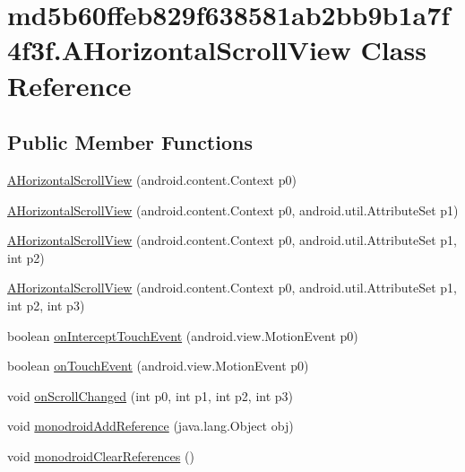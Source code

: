 \hypertarget{classmd5b60ffeb829f638581ab2bb9b1a7f4f3f_1_1_a_horizontal_scroll_view}{
\section{md5b60ffeb829f638581ab2bb9b1a7f4f3f.AHorizontalScrollView Class Reference}
\label{classmd5b60ffeb829f638581ab2bb9b1a7f4f3f_1_1_a_horizontal_scroll_view}
}
\subsection*{Public Member Functions}
\begin{CompactItemize}
\item 
\hyperlink{classmd5b60ffeb829f638581ab2bb9b1a7f4f3f_1_1_a_horizontal_scroll_view_f5243d774c5a226c8d990803ca71be44}{AHorizontalScrollView} (android.content.Context p0)
\item 
\hyperlink{classmd5b60ffeb829f638581ab2bb9b1a7f4f3f_1_1_a_horizontal_scroll_view_152d1e31c4cbb0b713c94c701d37a586}{AHorizontalScrollView} (android.content.Context p0, android.util.AttributeSet p1)
\item 
\hyperlink{classmd5b60ffeb829f638581ab2bb9b1a7f4f3f_1_1_a_horizontal_scroll_view_39296f4d2bb34f96db535ce39d024d99}{AHorizontalScrollView} (android.content.Context p0, android.util.AttributeSet p1, int p2)
\item 
\hyperlink{classmd5b60ffeb829f638581ab2bb9b1a7f4f3f_1_1_a_horizontal_scroll_view_0d9f33e5410003f982e1bddcb71639df}{AHorizontalScrollView} (android.content.Context p0, android.util.AttributeSet p1, int p2, int p3)
\item 
boolean \hyperlink{classmd5b60ffeb829f638581ab2bb9b1a7f4f3f_1_1_a_horizontal_scroll_view_316c95b751f0a5c1adea69370d5325f2}{onInterceptTouchEvent} (android.view.MotionEvent p0)
\item 
boolean \hyperlink{classmd5b60ffeb829f638581ab2bb9b1a7f4f3f_1_1_a_horizontal_scroll_view_a8fe4de3af4981fca3ea1efa4d423798}{onTouchEvent} (android.view.MotionEvent p0)
\item 
void \hyperlink{classmd5b60ffeb829f638581ab2bb9b1a7f4f3f_1_1_a_horizontal_scroll_view_308c3a91c514c6d38d0b97ea55e0e988}{onScrollChanged} (int p0, int p1, int p2, int p3)
\item 
void \hyperlink{classmd5b60ffeb829f638581ab2bb9b1a7f4f3f_1_1_a_horizontal_scroll_view_b9c83144693d24a7290a699e37f9d99d}{monodroidAddReference} (java.lang.Object obj)
\item 
void \hyperlink{classmd5b60ffeb829f638581ab2bb9b1a7f4f3f_1_1_a_horizontal_scroll_view_d7c4b2bdd6ed74674575ab60c82d8e0c}{monodroidClearReferences} ()
\end{CompactItemize}
